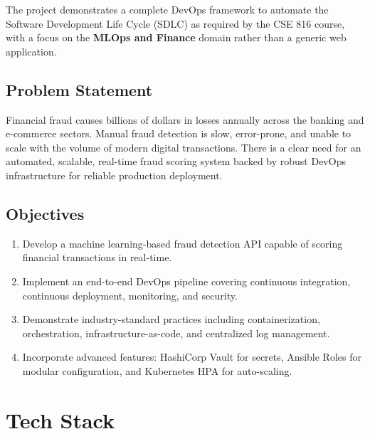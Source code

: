 \documentclass[12pt,a4paper]{article}
\begin{document}
The project demonstrates a complete DevOps framework to automate the Software Development Life Cycle (SDLC) as required by the CSE 816 course, with a focus on the \textbf{MLOps and Finance} domain rather than a generic web application.

\subsection{Problem Statement}

Financial fraud causes billions of dollars in losses annually across the banking and e-commerce sectors. Manual fraud detection is slow, error-prone, and unable to scale with the volume of modern digital transactions. There is a clear need for an automated, scalable, real-time fraud scoring system backed by robust DevOps infrastructure for reliable production deployment.

\subsection{Objectives}

\begin{enumerate}
    \item Develop a machine learning-based fraud detection API capable of scoring financial transactions in real-time.
    \item Implement an end-to-end DevOps pipeline covering continuous integration, continuous deployment, monitoring, and security.
    \item Demonstrate industry-standard practices including containerization, orchestration, infrastructure-as-code, and centralized log management.
    \item Incorporate advanced features: HashiCorp Vault for secrets, Ansible Roles for modular configuration, and Kubernetes HPA for auto-scaling.
\end{enumerate}

\section{Tech Stack}
\end{document}
